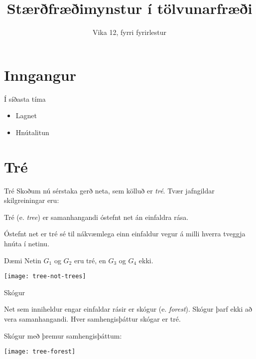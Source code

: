 \documentclass[handout]{beamer}
\title{Stærðfræðimynstur í tölvunarfræði}
\subtitle{Vika 12, fyrri fyrirlestur}
\begin{document}
\begin{frame}
\titlepage
\end{frame}


\section{Inngangur}

\begin{frame}{Í síðasta tíma}
\begin{itemize}
 \item Lagnet
 \item Hnútalitun
\end{itemize}
\end{frame}

\section{Tré}

\begin{frame}{Tré}
Skoðum nú sérstaka gerð neta, sem kölluð er \emph{tré}. Tvær jafngildar skilgreiningar eru:

\begin{tcolorbox}[title=Tré]
Tré (e. \emph{tree}) er samanhangandi óstefnt net án einfaldra rása.
\end{tcolorbox}

\begin{tcolorbox}[title=Tré]
Óstefnt net er tré sé til nákvæmlega einn einfaldur vegur á milli hverra tveggja hnúta í netinu.
\end{tcolorbox}

\end{frame}

\begin{frame}{Dæmi}
Netin $G_1$ og $G_2$ eru tré, en $G_3$ og $G_4$ ekki.
\begin{center}
\texttt{[image: tree-not-trees]}
\end{center}
\end{frame}

\begin{frame}{Skógur}
\begin{tcolorbox}[title=Skógur]
Net sem inniheldur engar einfaldar rásir er skógur (e. \emph{forest}). Skógur þarf ekki að vera samanhangandi. Hver samhengisþáttur skógar er tré.
\end{tcolorbox}
Skógur með þremur samhengisþáttum:
\begin{center}
\texttt{[image: tree-forest]}
\end{center}
\end{frame}
\end{document}
